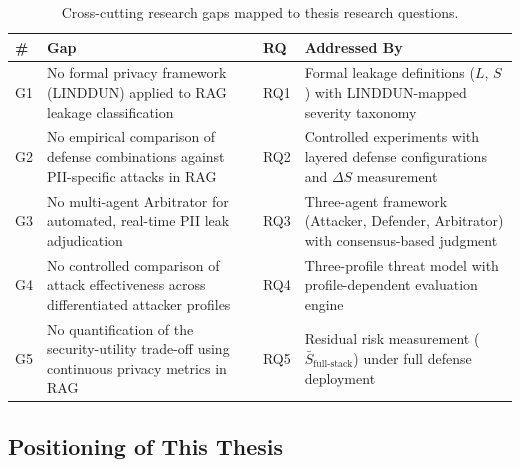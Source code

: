 \documentclass[12pt, a4paper]{article}
\begin{document}
\begin{table}[H]
\centering
\caption{Cross-cutting research gaps mapped to thesis research questions.}
\label{tab:gap-matrix}
\footnotesize
{}
\begin{tabular}{C{0.5cm} L{6.5cm} C{1.2cm} L{4.5cm}}
\toprule
{}
\color{white}\textbf{\#} &
\color{white}\textbf{Gap} &
\color{white}\textbf{RQ} &
\color{white}\textbf{Addressed By} \\
\midrule
G1 & No formal privacy framework (LINDDUN) applied to RAG leakage classification & RQ1 & Formal leakage definitions ($L$, $S$) with LINDDUN-mapped severity taxonomy \\
G2 & No empirical comparison of defense combinations against PII-specific attacks in RAG & RQ2 & Controlled experiments with layered defense configurations and $\Delta S$ measurement \\
G3 & No multi-agent Arbitrator for automated, real-time PII leak adjudication & RQ3 & Three-agent framework (Attacker, Defender, Arbitrator) with consensus-based judgment \\
G4 & No controlled comparison of attack effectiveness across differentiated attacker profiles & RQ4 & Three-profile threat model with profile-dependent evaluation engine \\
G5 & No quantification of the security-utility trade-off using continuous privacy metrics in RAG & RQ5 & Residual risk measurement ($\bar{S}_{\text{full-stack}}$) under full defense deployment \\
\bottomrule
\end{tabular}
\end{table}

\subsection{Positioning of This Thesis}
\end{document}

